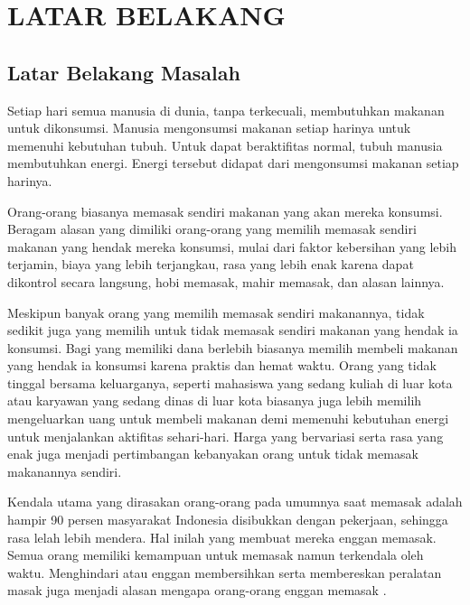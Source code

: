 
\chapter{LATAR BELAKANG}

\section{Latar Belakang Masalah}
Setiap hari semua manusia di dunia, tanpa terkecuali, membutuhkan makanan untuk dikonsumsi. Manusia mengonsumsi makanan setiap harinya untuk memenuhi kebutuhan tubuh. Untuk dapat beraktifitas normal, tubuh manusia membutuhkan energi. Energi tersebut didapat dari mengonsumsi makanan setiap harinya.

Orang-orang biasanya memasak sendiri makanan yang akan mereka konsumsi. Beragam alasan yang dimiliki orang-orang yang memilih memasak sendiri makanan yang hendak mereka konsumsi, mulai dari faktor kebersihan yang lebih terjamin, biaya yang lebih terjangkau, rasa yang lebih enak karena dapat dikontrol secara langsung, hobi memasak, mahir memasak, dan alasan lainnya. 

Meskipun banyak orang yang memilih memasak sendiri makanannya, tidak sedikit juga yang memilih untuk tidak memasak sendiri makanan yang hendak ia konsumsi. Bagi yang memiliki dana berlebih biasanya memilih membeli makanan yang hendak ia konsumsi karena praktis dan hemat waktu. Orang yang tidak tinggal bersama keluarganya, seperti mahasiswa yang sedang kuliah di luar kota atau karyawan yang sedang dinas di luar kota biasanya juga lebih memilih mengeluarkan uang untuk membeli makanan demi memenuhi kebutuhan energi untuk menjalankan aktifitas sehari-hari. Harga yang bervariasi serta rasa yang enak juga menjadi pertimbangan kebanyakan orang untuk tidak memasak makanannya sendiri.

Kendala utama yang dirasakan orang-orang pada umumnya saat memasak adalah hampir 90 persen masyarakat Indonesia disibukkan dengan pekerjaan, sehingga rasa lelah lebih mendera. Hal inilah yang membuat mereka enggan memasak. Semua orang memiliki kemampuan untuk memasak namun terkendala oleh waktu. Menghindari atau enggan membersihkan serta membereskan peralatan masak juga menjadi alasan mengapa orang-orang enggan memasak \cite{poernomo}.

